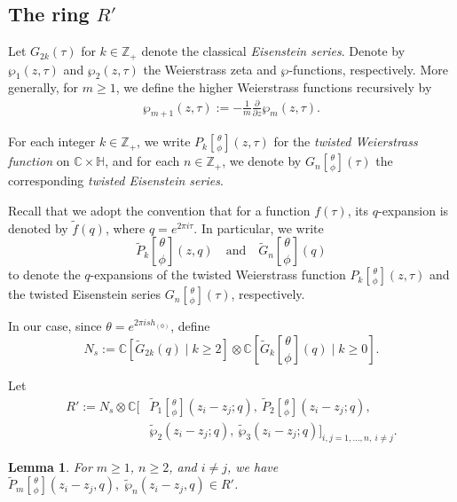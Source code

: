 \documentclass[9pt]{amsart}
\newtheorem{lemma}{Lemma}[section]
\begin{document}
\subsection{The ring \texorpdfstring{$R'$}{Lg}}\label{r'introduction}
Let \( G_{2k}(\tau) \) for \( k \in \mathbb{Z}_{+} \) denote the classical \emph{Eisenstein series}. Denote by \( \wp_1(z,\tau) \) and \( \wp_2(z,\tau) \) the Weierstrass zeta and \(\wp\)-functions, respectively. More generally, for \( m \geq 1 \), we define the higher Weierstrass functions recursively by
\begin{align}
    \wp_{m+1}(z,\tau) := -\frac{1}{m} \frac{\partial}{\partial z} \wp_m(z,\tau).
\end{align}

For each integer \( k \in \mathbb{Z}_{+} \), we write \( P_k\genfrac[]{0pt}{0}{\theta}{\phi}(z,\tau) \) for the \emph{twisted Weierstrass function} on \( \mathbb{C} \times \mathbb{H} \), and for each \( n \in \mathbb{Z}_{+} \), we denote by \( G_n\genfrac[]{0pt}{0}{\theta}{\phi}(\tau) \) the corresponding \emph{twisted Eisenstein series}.

Recall that we adopt the convention that for a function \( f(\tau) \), its \( q \)-expansion is denoted by \( \tilde{f}(q) \), where \( q = e^{2\pi i \tau} \). In particular, we write
\[
\tilde{P}_k\genfrac[]{0pt}{0}{\theta}{\phi}(z, q) \quad \text{and} \quad \tilde{G}_n\genfrac[]{0pt}{0}{\theta}{\phi}(q)
\]
to denote the \( q \)-expansions of the twisted Weierstrass function \( P_k\genfrac[]{0pt}{0}{\theta}{\phi}(z,\tau) \) and the twisted Eisenstein series \( G_n\genfrac[]{0pt}{0}{\theta}{\phi}(\tau) \), respectively.


In our case, since $\theta = e^{2\pi i s h_{(0)}}$, define
\[
N_s:= \mathbb{C}[\tilde{G}_{2k}(q) \mid k \geq 2] \otimes \mathbb{C}\left[\tilde{G}_k\genfrac[]{0pt}{0}{\theta}{\phi}(q) \mid k \geq 0\right].
\]

\noindent Let
\begin{align*}
R' := N_s \otimes \mathbb{C}\big[ &\tilde{P}_1\genfrac[]{0pt}{0}{\theta}{\phi}(z_i - z_j; q),\ 
\tilde{P}_2\genfrac[]{0pt}{0}{\theta}{\phi}(z_i - z_j; q), \\
&\tilde{\wp}_2(z_i - z_j; q),\ 
\tilde{\wp}_3(z_i - z_j; q) \big]_{i, j = 1,\dots,n,\ i \neq j}.
\end{align*}
\begin{lemma}
For $m \geq 1$, $n \geq 2$, and $i \neq j$, we have $\tilde{P}_m\genfrac[]{0pt}{0}{\theta}{\phi}(z_i - z_j, q),\; \tilde{\wp}_n(z_i - z_j, q) \in R'$.
\end{lemma}
\end{document}
